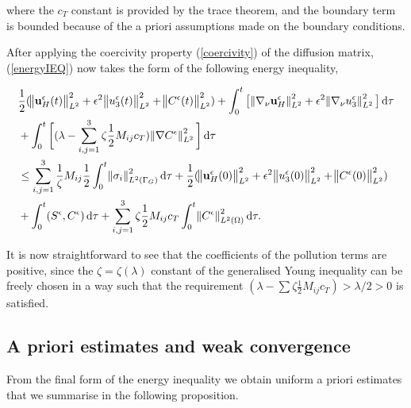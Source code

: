 \documentclass[11pt]{article}
\newcommand*\diff{\mathop{}\!\mathrm{d}}
\begin{document}
  where the $c_T$ constant is provided by the trace theorem, and the boundary term is bounded because of the a priori assumptions made on the boundary conditions.
  
   After applying the coercivity property (\ref{coercivity}) of the diffusion matrix, (\ref{energyIEQ}) now takes the form of the following energy inequality,

  \begin{equation}
    \begin{split}  
    & \frac{1}{2} (\norm{\mathbf{u}_H^\epsilon (t)}_{L^2}^2 + \epsilon ^ 2 \norm{u_3^\epsilon (t)}_{L^2}^2 + \norm{C^\epsilon (t)}_{L^2}^2) + \int_0 ^ t \big [\norm{\nabla_\nu \mathbf{u}_H^\epsilon}_{L^2}^2 + \epsilon ^ 2 \norm{\nabla_\nu u_3^\epsilon}_{L^2}^2 \big ] \diff \tau \\
    & + \int_0 ^ t \bigg[ (\lambda - \sum_{i,j = 1}^3 \zeta \frac{1}{2} M_{ij} c_T) \norm{\nabla C^\epsilon}_{L^2}^2  \bigg] \diff \tau \\
    & \leq \sum_{i,j = 1}^3 \frac{1}{\zeta} M_{ij} \frac{1}{2} \int_0 ^ t \norm{\sigma_i}^2 _{L^2 (\Gamma_G)} \diff \tau + \frac{1}{2} (\norm{\mathbf{u}_H^\epsilon (0)}_{L^2}^2 + \epsilon ^ 2 \norm{u_3^\epsilon (0)}_{L^2}^2 + \norm{C^\epsilon (0)}_{L^2}^2) \\
    & + \int_0^t (S^\epsilon,C^\epsilon) \diff \tau + \sum_{i,j = 1}^3 \zeta \frac{1}{2} M_{ij} c_T  \int_0 ^ t \norm{C^\epsilon}^2 _{L^2 (\Omega) } \diff \tau. \raisetag{90pt} \label{finalformEIEQ}
    \end{split}
  \end{equation}  
    
  It is now straightforward to see that the coefficients of the pollution terms are positive, since the $\zeta = \zeta(\lambda)$ constant of the generalised Young inequality can be freely chosen in a way such that the requirement $(\lambda - \sum \zeta \frac{1}{2} M_{ij} c_T) > \lambda/2 > 0$ is satisfied.
    
  \subsection{A priori estimates and weak convergence}
  
  From the final form of the energy inequality we obtain uniform a priori estimates that we summarise in the following proposition.
  
\end{document}
